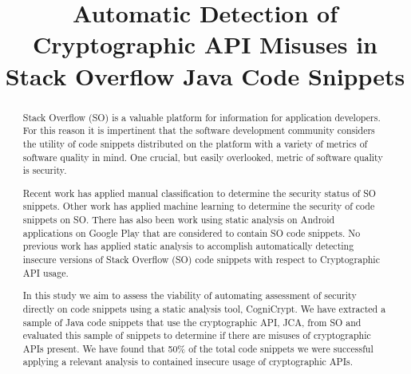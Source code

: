 \documentclass[10pt, conference]{IEEEtran}
\begin{document}
\title{Automatic Detection of Cryptographic API Misuses in Stack Overflow Java Code Snippets\\}

\author{
}



\maketitle

\begin{abstract}
Stack Overflow (SO) is a valuable platform for information for application developers. For this reason it is impertinent that the software development community considers the utility of code snippets distributed on the platform with a variety of metrics of software quality in mind. One crucial, but easily overlooked, metric of software quality is security. 

Recent work has applied manual classification to determine the security status of SO snippets. Other  work has applied machine learning to determine the security of code snippets on SO. There has also been work using static analysis on Android applications on Google Play that are considered to contain SO code snippets. No previous work has applied static analysis to accomplish automatically detecting insecure versions of Stack Overflow (SO) code snippets with respect to Cryptographic API usage.

In this study we aim to assess the viability of automating assessment of security directly on code snippets using a static analysis tool, CogniCrypt. We have extracted a sample of Java code snippets that use the cryptographic API, JCA, from SO and evaluated this sample of snippets to determine if there are misuses of cryptographic APIs present. We have found that 50\% of the total code snippets we were successful applying a relevant analysis to contained insecure usage of cryptographic APIs. 
\end{abstract}
\end{document}
